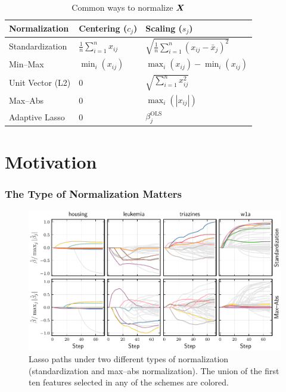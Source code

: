 \documentclass[10pt]{beamer}
\begin{document}
\begin{frame}[c]
  \begin{table}[hbt]
    \centering
    \caption{Common ways to normalize \(\boldsymbol{X}\)}
    \begin{tabular}{lll}
      \toprule
      Normalization    & Centering (\(c_{j}\))              & Scaling (\(s_j\))                                         \\
      \midrule
      Standardization  & \(\frac{1}{n}\sum_{i=1}^n x_{ij}\) & \(\sqrt{\frac{1}{n}\sum_{i=1}^n (x_{ij} - \bar{x}_j)^2}\) \\
      \addlinespace
      Min--Max         & \(\min_i(x_{ij})\)                 & \(\max_i(x_{ij}) - \min_i(x_{ij})\)                       \\
      \addlinespace
      Unit Vector (L2) & 0                                  & \(\sqrt{\sum_{i=1}^n x_{ij}^2}\)                          \\
      \addlinespace
      Max--Abs         & 0                                  & \(\max_i(|x_{ij}|)\)                                      \\
      \addlinespace
      Adaptive Lasso   & 0                                  & \(\beta_j^\text{OLS}\)                                    \\
      \bottomrule
    \end{tabular}
  \end{table}
\end{frame}

\section{Motivation}

\begin{frame}[c]
  \frametitle{The Type of Normalization Matters}

  \begin{figure}[htpb]
    \centering
    \includegraphics[width=\textwidth]{figures/realdata_paths.pdf}
    \caption{%
      Lasso paths under two different types of normalization (standardization and max--abs normalization). The union of the first ten features selected in any of the schemes are colored.
    }
  \end{figure}

\end{frame}
\end{document}
